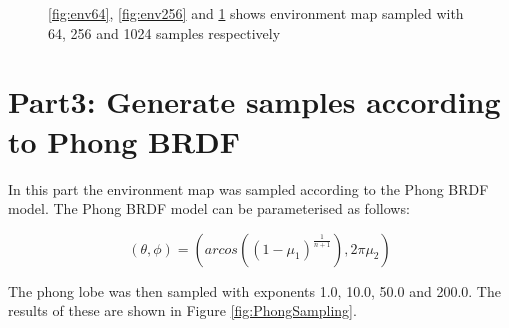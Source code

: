 \documentclass[fleqn, hidelinks]{article} %
\begin{document}
\begin{figure}
\begin{subfigure}[b]{\textwidth}
                \caption{}
                \label{fig:env1024}
        \end{subfigure}
        \caption{\ref{fig:env64}, \ref{fig:env256} and \ref{fig:env1024} shows environment map sampled with 64, 256 and 1024 samples respectively}\label{fig:EMSampling}
\end{figure}


\section{Part3: Generate samples according to Phong BRDF}

In this part the environment map was sampled according to the Phong BRDF model. The Phong BRDF model can be parameterised as follows:

\begin{equation}
	(\theta, \phi) = (arcos((1-\mu_1)^{\frac{1}{n+1}}), 2\pi\mu_2)
	\label{eqn:phong}
\end{equation}

The phong lobe was then sampled with exponents 1.0, 10.0, 50.0 and 200.0. The results of these are shown in Figure \ref{fig:PhongSampling}.
\end{document}
